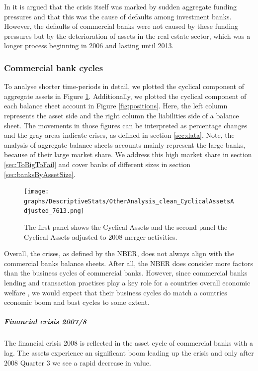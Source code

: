 \documentclass[12pt, a4paper]{article} %
\begin{document}
In \citet{antoniades2019commercial} it is argued that the crisis itself was marked by sudden aggregate funding pressures and that this was the cause of defaults among investment banks. However, the defaults of commercial banks were not caused by these funding pressures but by the deterioration of assets in the real estate sector, which was a longer process beginning in 2006 and lasting until 2013.
\fi




\subsubsection{Commercial bank cycles}

To analyse shorter time-periods in detail, we plotted the cyclical component of aggregate assets in Figure \ref{fig:cyclial_assets}. Additionally, we plotted the cyclical component of each balance sheet account in Figure \ref{fig:positions}. Here, the left column represents the asset side and the right column the liabilities side of a balance sheet. The movements in those figures can be interpreted as percentage changes and the gray areas indicate crises, as defined in section \ref{sec:data}. Note, the analysis of aggregate balance sheets accounts mainly represent the large banks, because of their large market share. We address this high market share in section \ref{sec:ToBigToFail} and cover banks of different sizes in section \ref{sec:banksByAssetSize}.

\begin{figure}[H]
\begin{minipage}{\textwidth}
\texttt{[image: graphs/DescriptiveStats/OtherAnalysis\_clean\_CyclicalAssetsAdjusted\_7613.png]}
\caption[1]{The first panel shows the Cyclical Assets and the second panel the Cyclical Assets adjusted to 2008 merger activities.}
\label{fig:cyclial_assets}

\end{minipage}
\end{figure}

Overall, the crises, as defined by the NBER, does not always align with the commercial banks balance sheets. After all, the NBER does consider more factors than the business cycles of commercial banks. However, since commercial banks lending and transaction practises play a key role for a countries overall economic welfare , we would expect that their business cycles do match a countries economic boom and bust cycles to some extent.


\subparagraph{Financial crisis 2007/8}
The financial crisis 2008 is reflected in the asset cycle of commercial banks with a lag. The assets experience an significant boom leading up the crisis and only after $2008$ Quarter 3 we see a rapid decrease in value.
\end{document}
